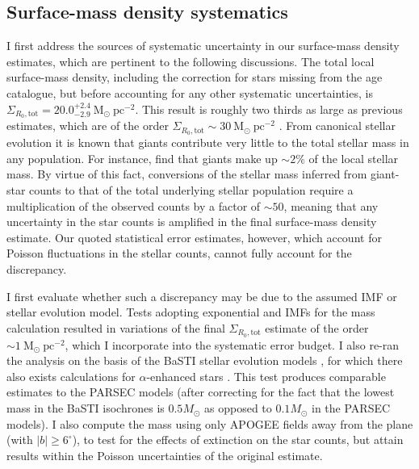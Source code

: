 \subsection{Surface-mass density systematics}
\label{sec:discrepant}
I first address the sources of systematic uncertainty in our surface-mass density estimates, which are pertinent to the following discussions. The total local surface-mass density, including the correction for stars missing from the age catalogue, but before accounting for any other systematic uncertainties, is $\Sigma_{R_0, \text{tot}} = 20.0_{-2.9}^{+2.4}\ \mathrm{M_{\odot} \ pc^{-2}}$. This result is roughly two thirds as large as previous estimates, which are of the order $\Sigma_{R_0, \text{tot}} \sim 30\ \mathrm{M_{\odot} \ pc^{-2}}$ \citep[e.g.][]{2006MNRAS.372.1149F,2012ApJ...751..131B,2015ApJ...814...13M}. From canonical stellar evolution it is known that giants contribute very little to the total stellar mass in any population. For instance, \citet{2015ApJ...814...13M} find that giants make up $\sim 2\%$ of the local stellar mass. By virtue of this fact, conversions of the stellar mass inferred from giant-star counts to that of the total underlying stellar population require a multiplication of the observed counts by a factor of $\sim 50$, meaning that any uncertainty in the star counts is amplified in the final surface-mass density estimate. Our quoted statistical error estimates, however, which account for Poisson fluctuations in the stellar counts, cannot fully account for the discrepancy. 

I first evaluate whether such a discrepancy may be due to the assumed IMF or stellar evolution model. Tests adopting exponential \citet{2003PASP..115..763C} and \citet{2001MNRAS.322..231K} IMFs for the mass calculation resulted in variations of the final $\Sigma_{R_0, \text{tot}}$ estimate of the order $\sim 1\ \mathrm{M_{\odot}\ pc^{-2}}$, which I incorporate into the systematic error budget. I also re-ran the analysis on the basis of the BaSTI stellar evolution models \citep{2004ApJ...612..168P}, for which there also exists calculations for $\alpha$-enhanced stars \citep{2006ApJ...642..797P}. This test produces comparable estimates to the PARSEC models (after correcting for the fact that the lowest mass in the BaSTI isochrones is $0.5 M_{\odot}$ as opposed to $0.1 M_{\odot}$ in the PARSEC models). I also compute the mass using only APOGEE fields away from the plane (with $|b|\geq 6^{\circ}$), to test for the effects of extinction on the star counts, but attain results within the Poisson uncertainties of the original estimate.

